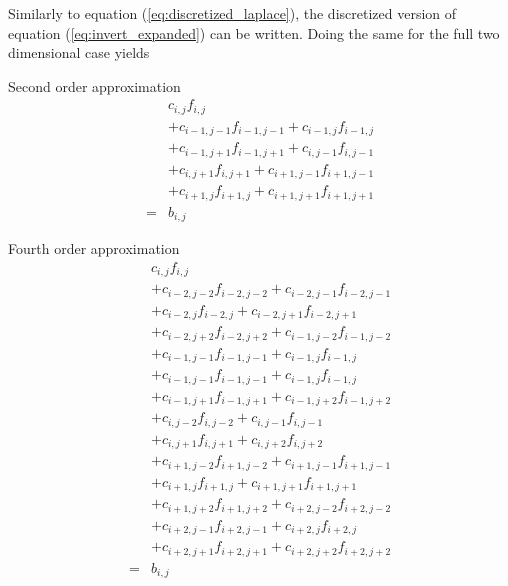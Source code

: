 \documentclass[12pt]{article}
\begin{document}
Similarly to equation (\ref{eq:discretized_laplace}), the discretized version
of equation (\ref{eq:invert_expanded}) can be written. Doing the same for the
full two dimensional case yields\\
%
\begin{minipage}{0.45\textwidth}
Second order approximation
%
\begin{align*}
    \;
    &
    c_{i,j}
    f_{i,j}
    \\
    &+
    c_{i-1,j-1}
    f_{i-1,j-1}
    +
    c_{i-1,j}
    f_{i-1,j}
    \\
    &+
    c_{i-1,j+1}
    f_{i-1,j+1}
    +
    c_{i,j-1}
    f_{i,j-1}
    \\
    &+
    c_{i,j+1}
    f_{i,j+1}
    +
    c_{i+1,j-1}
    f_{i+1,j-1}
    \\
    &+
    c_{i+1,j}
    f_{i+1,j}
    +
    c_{i+1,j+1}
    f_{i+1,j+1}
    \\
%
    =& b_{i,j}
\end{align*}
\end{minipage}
%
\hspace{1cm}
%
\begin{minipage}{0.45\textwidth}
Fourth order approximation
%
\begin{align*}
    \;
    &
    c_{i,j}
    f_{i,j}
    \\
    &+
    c_{i-2,j-2}
    f_{i-2,j-2}
    +
    c_{i-2,j-1}
    f_{i-2,j-1}
    \\
    &+
    c_{i-2,j}
    f_{i-2,j}
    +
    c_{i-2,j+1}
    f_{i-2,j+1}
    \\
    &+
    c_{i-2,j+2}
    f_{i-2,j+2}
    +
    c_{i-1,j-2}
    f_{i-1,j-2}
    \\
    &+
    c_{i-1,j-1}
    f_{i-1,j-1}
    +
    c_{i-1,j}
    f_{i-1,j}
    \\
    &+
    c_{i-1,j-1}
    f_{i-1,j-1}
    +
    c_{i-1,j}
    f_{i-1,j}
    \\
    &+
    c_{i-1,j+1}
    f_{i-1,j+1}
    +
    c_{i-1,j+2}
    f_{i-1,j+2}
    \\
    &+
    c_{i,j-2}
    f_{i,j-2}
    +
    c_{i,j-1}
    f_{i,j-1}
    \\
    &+
    c_{i,j+1}
    f_{i,j+1}
    +
    c_{i,j+2}
    f_{i,j+2}
    \\
    &+
    c_{i+1,j-2}
    f_{i+1,j-2}
    +
    c_{i+1,j-1}
    f_{i+1,j-1}
    \\
    &+
    c_{i+1,j}
    f_{i+1,j}
    +
    c_{i+1,j+1}
    f_{i+1,j+1}
    \\
    &+
    c_{i+1,j+2}
    f_{i+1,j+2}
    +
    c_{i+2,j-2}
    f_{i+2,j-2}
    \\
    &+
    c_{i+2,j-1}
    f_{i+2,j-1}
    +
    c_{i+2,j}
    f_{i+2,j}
    \\
    &+
    c_{i+2,j+1}
    f_{i+2,j+1}
    +
    c_{i+2,j+2}
    f_{i+2,j+2}
    \\
%
    =& b_{i,j}
\end{align*}
\end{minipage}
\end{document}
